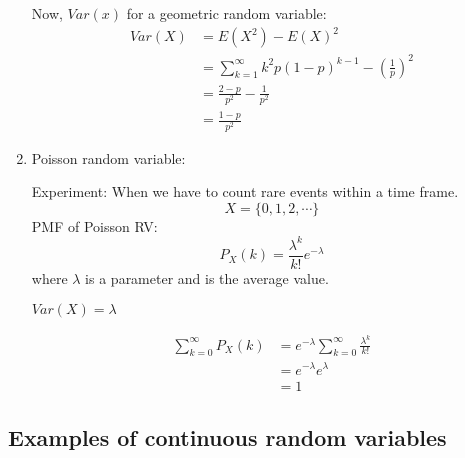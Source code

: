 \documentclass{article}
\begin{document}
\begin{enumerate}
    Now, $Var(x)$ for a geometric random variable:
    \begin{align*}
        Var(X)&= E(X^2)-E(X)^2 \\
        &=  \sum_{k=1}^{\infty} k^2 p (1-p)^{k-1} - \left( \frac{1}{p}\right) ^2 \\
        &= \frac{2-p}{p^2} - \frac{1}{p^2} \\
        &= \frac{1-p}{p^2}
    \end{align*}
    \item Poisson random variable:

    Experiment: When we have to count rare events within a time frame.
    $$ X= \{ 0,1,2, \cdots\}$$
    PMF of Poisson RV:
    $$ P_X(k)= \frac{\lambda ^k}{k!} e^{-\lambda}$$
    where $\lambda$ is a parameter and is the average value.

    $Var(X)= \lambda$

    \begin{align*}
        \sum_{k=0}^{\infty} P_X(k) &= e^{-\lambda } \sum_{k=0}^{\infty} \frac{\lambda ^k}{k!} \\
        &= e^{-\lambda} e^{\lambda} \\
        &= 1
    \end{align*}
\end{enumerate}

\subsection{Examples of continuous random variables}
\end{document}
